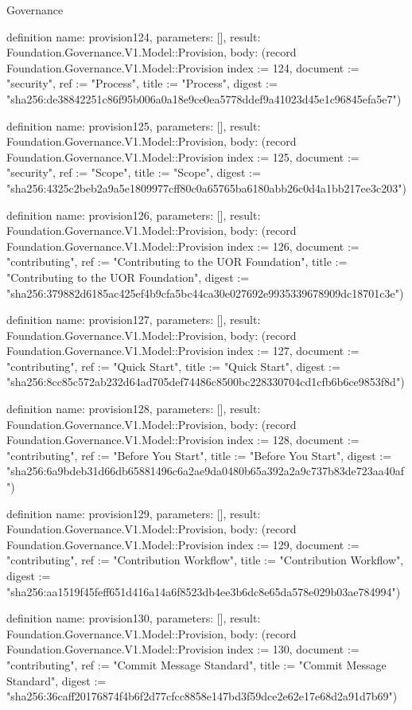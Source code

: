 \begin{lexlean}{Governance}
\begin{semanticmodule}
definition{
  name: provision124,
  parameters: [],
  result: Foundation.Governance.V1.Model::Provision,
  body: (record Foundation.Governance.V1.Model::Provision {index := 124, document := "security", ref := "Process", title := "Process", digest := "sha256:de38842251c86f95b006a0a18e9ce0ea5778ddef9a41023d45e1c96845efa5e7"})
}

definition{
  name: provision125,
  parameters: [],
  result: Foundation.Governance.V1.Model::Provision,
  body: (record Foundation.Governance.V1.Model::Provision {index := 125, document := "security", ref := "Scope", title := "Scope", digest := "sha256:4325c2beb2a9a5e1809977cff80c0a65765ba6180abb26c0d4a1bb217ee3c203"})
}

definition{
  name: provision126,
  parameters: [],
  result: Foundation.Governance.V1.Model::Provision,
  body: (record Foundation.Governance.V1.Model::Provision {index := 126, document := "contributing", ref := "Contributing to the UOR Foundation", title := "Contributing to the UOR Foundation", digest := "sha256:379882d6185ac425ef4b9cfa5bc44ca30e027692e9935339678909dc18701c3e"})
}

definition{
  name: provision127,
  parameters: [],
  result: Foundation.Governance.V1.Model::Provision,
  body: (record Foundation.Governance.V1.Model::Provision {index := 127, document := "contributing", ref := "Quick Start", title := "Quick Start", digest := "sha256:8cc85c572ab232d64ad705def74486c8500bc228330704cd1cfb6b6ce9853f8d"})
}

definition{
  name: provision128,
  parameters: [],
  result: Foundation.Governance.V1.Model::Provision,
  body: (record Foundation.Governance.V1.Model::Provision {index := 128, document := "contributing", ref := "Before You Start", title := "Before You Start", digest := "sha256:6a9bdeb31d66db65881496c6a2ae9da0480b65a392a2a9c737b83de723aa40af"})
}

definition{
  name: provision129,
  parameters: [],
  result: Foundation.Governance.V1.Model::Provision,
  body: (record Foundation.Governance.V1.Model::Provision {index := 129, document := "contributing", ref := "Contribution Workflow", title := "Contribution Workflow", digest := "sha256:aa1519f45feff651d416a14a6f8523db4ee3b6dc8e65da578e029b03ae784994"})
}

definition{
  name: provision130,
  parameters: [],
  result: Foundation.Governance.V1.Model::Provision,
  body: (record Foundation.Governance.V1.Model::Provision {index := 130, document := "contributing", ref := "Commit Message Standard", title := "Commit Message Standard", digest := "sha256:36caff20176874f4b6f2d77cfcc8858e147bd3f59dce2e62e17e68d2a91d7b69"})
}


\end{semanticmodule}
\end{lexlean}
